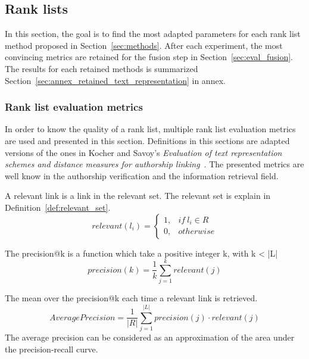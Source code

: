 \subsection{Rank lists \label{sec:eval_rl}}

In this section, the goal is to find the most adapted parameters for each rank list method proposed in Section~\ref{sec:methods}.
After each experiment, the most convincing metrics are retained for the fusion step in Section~\ref{sec:eval_fusion}.
The results for each retained methods is summarized Section~\ref{sec:annex_retained_text_representation} in annex.

\subsubsection{Rank list evaluation metrics}
\label{sec:rl_eval}

In order to know the quality of a rank list, multiple rank list evaluation metrics are used and presented in this section.
Definitions in this sections are adapted versions of the ones in Kocher and Savoy's \textit{Evaluation of text representation schemes and distance measures for authorship linking}~\cite{kocher_linking}.
The presented metrics are well know in the authorship verification and the information retrieval field.

\begin{definition}
  A relevant link is a link in the relevant set.
  The relevant set is explain in Definition~\ref{def:relevant_set}.
  \begin{equation}
    relevant(l_i) =
    \begin{cases}
      1, & if\ l_i \in R \\
      0, & otherwise
    \end{cases}
  \end{equation}
\end{definition}

\begin{definition}
  The precision@k is a function which take a positive integer k, with k < |L|
  \begin{equation}
    precision(k) = \frac{1}{k} \sum_{j=1}^{k} relevant(j)
  \end{equation}
\end{definition}

\begin{definition}
  The mean over the precision@k each time a relevant link is retrieved.
  \begin{equation}
    AveragePrecision = \frac{1}{|R|} \sum_{j=1}^{|L|} precision(j) \cdot relevant(j)
  \end{equation}
  The average precision can be considered as an approximation of the area under the precision-recall curve.
\end{definition}


